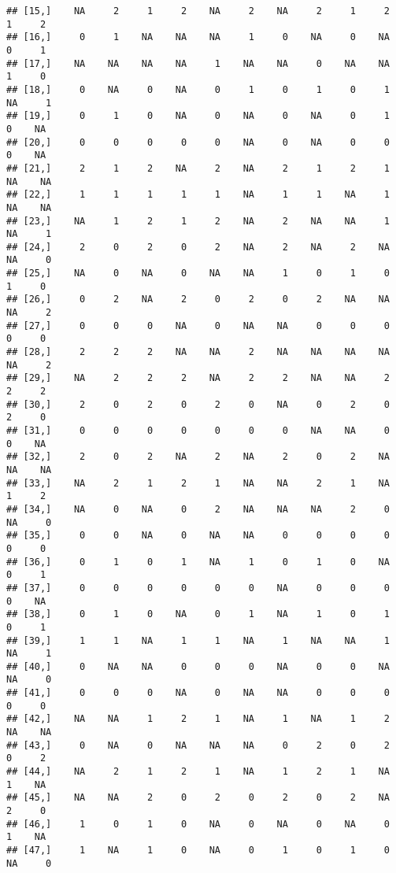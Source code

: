 \documentclass[
]{article}
\begin{document}
\begin{verbatim}
## [15,]    NA     2     1     2    NA     2    NA     2     1     2     1     2
## [16,]     0     1    NA    NA    NA     1     0    NA     0    NA     0     1
## [17,]    NA    NA    NA    NA     1    NA    NA     0    NA    NA     1     0
## [18,]     0    NA     0    NA     0     1     0     1     0     1    NA     1
## [19,]     0     1     0    NA     0    NA     0    NA     0     1     0    NA
## [20,]     0     0     0     0     0    NA     0    NA     0     0     0    NA
## [21,]     2     1     2    NA     2    NA     2     1     2     1    NA    NA
## [22,]     1     1     1     1     1    NA     1     1    NA     1    NA    NA
## [23,]    NA     1     2     1     2    NA     2    NA    NA     1    NA     1
## [24,]     2     0     2     0     2    NA     2    NA     2    NA    NA     0
## [25,]    NA     0    NA     0    NA    NA     1     0     1     0     1     0
## [26,]     0     2    NA     2     0     2     0     2    NA    NA    NA     2
## [27,]     0     0     0    NA     0    NA    NA     0     0     0     0     0
## [28,]     2     2     2    NA    NA     2    NA    NA    NA    NA    NA     2
## [29,]    NA     2     2     2    NA     2     2    NA    NA     2     2     2
## [30,]     2     0     2     0     2     0    NA     0     2     0     2     0
## [31,]     0     0     0     0     0     0     0    NA    NA     0     0    NA
## [32,]     2     0     2    NA     2    NA     2     0     2    NA    NA    NA
## [33,]    NA     2     1     2     1    NA    NA     2     1    NA     1     2
## [34,]    NA     0    NA     0     2    NA    NA    NA     2     0    NA     0
## [35,]     0     0    NA     0    NA    NA     0     0     0     0     0     0
## [36,]     0     1     0     1    NA     1     0     1     0    NA     0     1
## [37,]     0     0     0     0     0     0    NA     0     0     0     0    NA
## [38,]     0     1     0    NA     0     1    NA     1     0     1     0     1
## [39,]     1     1    NA     1     1    NA     1    NA    NA     1    NA     1
## [40,]     0    NA    NA     0     0     0    NA     0     0    NA    NA     0
## [41,]     0     0     0    NA     0    NA    NA     0     0     0     0     0
## [42,]    NA    NA     1     2     1    NA     1    NA     1     2    NA    NA
## [43,]     0    NA     0    NA    NA    NA     0     2     0     2     0     2
## [44,]    NA     2     1     2     1    NA     1     2     1    NA     1    NA
## [45,]    NA    NA     2     0     2     0     2     0     2    NA     2     0
## [46,]     1     0     1     0    NA     0    NA     0    NA     0     1    NA
## [47,]     1    NA     1     0    NA     0     1     0     1     0    NA     0

\end{verbatim}
\end{document}
